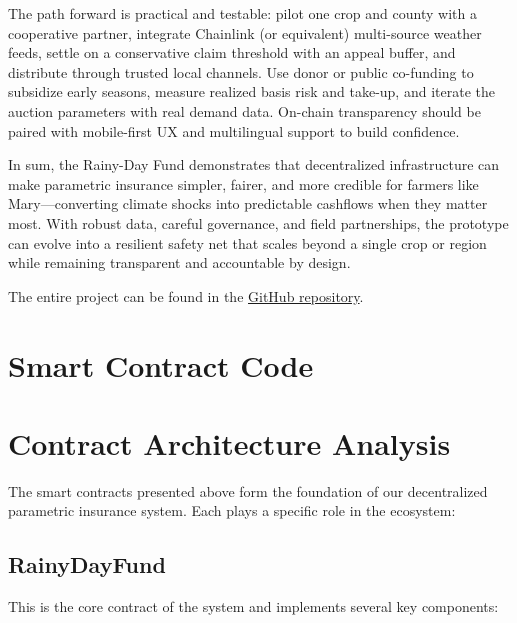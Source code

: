 \documentclass[11pt,a4paper]{article}
\begin{document}
		The path forward is practical and testable: pilot one crop and county with a cooperative partner, integrate Chainlink (or equivalent) multi-source weather feeds, settle on a conservative claim threshold with an appeal buffer, and distribute through trusted local channels.
        Use donor or public co-funding to subsidize early seasons, measure realized basis risk and take-up, and iterate the auction parameters with real demand data.
        On-chain transparency should be paired with mobile-first UX and multilingual support to build confidence.

		In sum, the Rainy-Day Fund demonstrates that decentralized infrastructure can make parametric insurance simpler, fairer, and more credible for farmers like Mary—converting climate shocks into predictable cashflows when they matter most.
        With robust data, careful governance, and field partnerships, the prototype can evolve into a resilient safety net that scales beyond a single crop or region while remaining transparent and accountable by design.

	    The entire project can be found in the \href{https://github.com/vincentschall/decentralized_weather_insurance}{GitHub repository}.

		\printbibliography

		\appendix
		\section{Smart Contract Code}\label{sec:contract-code}
		

		\section{Contract Architecture Analysis}\label{sec:contract-analysis}
		The smart contracts presented above form the foundation of our decentralized parametric insurance system.
		Each plays a specific role in the ecosystem:

		\subsection{RainyDayFund}\label{subsec:analysis-rainy-day-fund}
		This is the core contract of the system and implements several key components:
\end{document}
